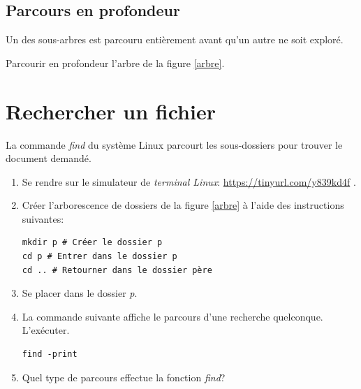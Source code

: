 \documentclass[a4paper,11pt]{article}
\begin{document}
\begin{Form}
\subsection{Parcours en profondeur}
Un des sous-arbres est parcouru entièrement avant qu'un autre ne soit exploré. 
\begin{activite}
Parcourir en profondeur l'arbre de la figure \ref{arbre}.
\end{activite}
\section{Rechercher un fichier}
La commande \emph{find} du système Linux parcourt les sous-dossiers pour trouver le document demandé.

\begin{activite}
\begin{enumerate}
\item Se rendre sur le simulateur de \emph{terminal Linux}: \url{https://tinyurl.com/y839kd4f} .
\item Créer l'arborescence de dossiers de la figure \ref{arbre} à l'aide des instructions suivantes:\\
\begin{lstlisting}
mkdir p # Créer le dossier p
cd p # Entrer dans le dossier p
cd .. # Retourner dans le dossier père
\end{lstlisting}
\item Se placer dans le dossier \emph{p}.
\item La commande suivante affiche le parcours d'une recherche quelconque. L'exécuter.
\begin{lstlisting}
find -print
\end{lstlisting}
\item Quel type de parcours effectue la fonction \emph{find}?
\end{enumerate}
\end{activite}
\end{Form}
\end{document}
